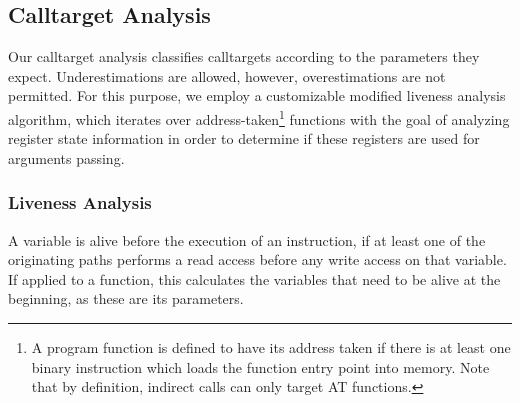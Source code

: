 

\subsection{Calltarget Analysis}
\label{section:calltargetanalysis}
Our calltarget analysis classifies calltargets according to the parameters they expect. Underestimations are allowed, however, overestimations 
are not permitted. For this purpose, we employ a customizable modified liveness analysis 
algorithm, which iterates over address-taken\footnote{A program function is defined to have its address taken if there is at least one binary instruction
which loads the function entry point into memory. Note that by definition, indirect calls can only target AT functions.} functions 
with the goal of analyzing register state information in order to determine if these registers are used for arguments passing.

\subsubsection{Liveness Analysis}
A variable is alive before the execution of an instruction, if at least one of the originating paths performs a read access before any write access on that variable. 
If applied to a function, this calculates the variables that need to be alive at the beginning, as these are its parameters. 

